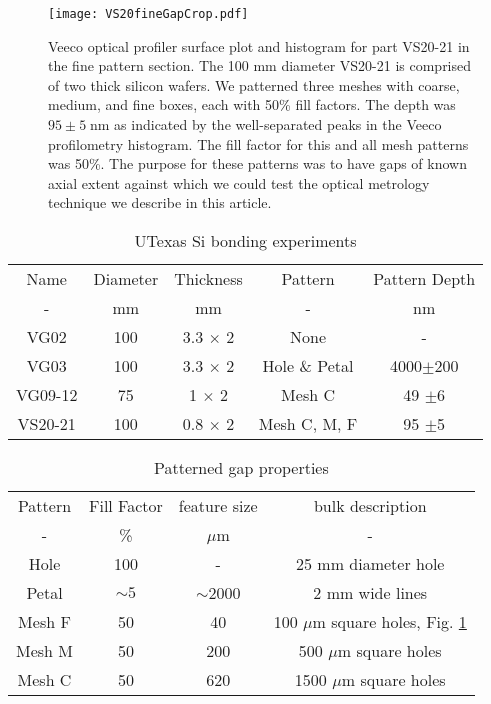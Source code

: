 \documentclass[osajnl,twocolumn,showpacs,superscriptaddress,11pt]{revtex4-1} %
\begin{document}
\begin{figure}[htbp]
\texttt{[image: VS20fineGapCrop.pdf]}
\caption{
\label{figVS20pattern}
Veeco optical profiler surface plot and histogram for part VS20-21 in the fine pattern section.  The 100 mm diameter VS20-21 is comprised of two thick silicon wafers.  We patterned three meshes with coarse, medium, and fine boxes, each with 50\% fill factors.  The depth was $95 \pm 5\;$nm as indicated by the well-separated peaks in the Veeco profilometry histogram.  The fill factor for this and all mesh patterns was 50\%.  The purpose for these patterns was to have gaps of known axial extent against which we could test the optical metrology technique we describe in this article.}
\end{figure}

\begin{table}[h!]
\caption{UTexas Si bonding experiments \label{tbl_experiments}}
\begin{center}
    \begin{tabular}{ c c c c c}
    \hline
    Name & Diameter & Thickness & Pattern & Pattern Depth\\ 
    -  & mm & mm & - & nm \\
        \hline
    VG02   & 100 & 3.3 $\times$ 2 &  None  & - \\
    VG03   & 100 & 3.3 $\times$ 2 &  Hole \& Petal & 4000$\pm$200 \\
    VG09-12   & 75   & 1 $\times$ 2 & Mesh C & 49 $\pm$6 \\
    VS20-21   & 100 & 0.8 $\times$ 2 &  Mesh C, M, F & 95 $\pm$5 \\
    \hline
    \end{tabular}
\end{center}
\end{table}


\begin{table}[h!]
\caption{Patterned gap properties \label{tbl_meshPatterns}}
\begin{center}
    \begin{tabular}{ c c c c }
    \hline
    Pattern & Fill Factor & feature size & bulk description \\ 
    - & \% & $\mu$m & - \\ 
    \hline
    Hole   & 100     &  -         & 25 mm diameter hole \\     
    Petal  & $\sim5$ & $\sim$2000 & 2 mm wide lines \\         
    Mesh F & 50      &         40 & 100 $\mu$m square holes, Fig. \ref{figVS20pattern}\\ 
    Mesh M & 50      & 200        & 500 $\mu$m square holes\\ 
    Mesh C & 50      & 620        & 1500 $\mu$m square holes\\     
        \hline
    \end{tabular}
\end{center}
\end{table}
\end{document}
